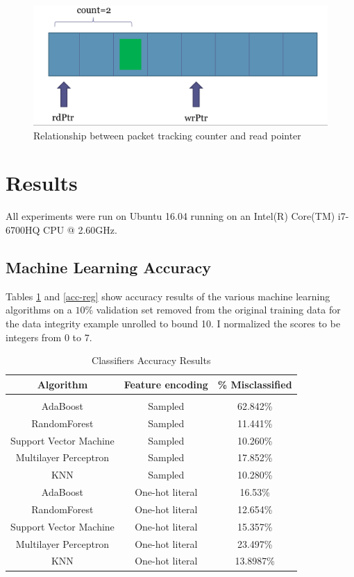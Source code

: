 \documentclass[letterpaper]{article} %
\begin{document}
\begin{figure}
\begin{center}
  \includegraphics[scale=0.15]{magicpacket.png}
  \caption{Relationship between packet tracking counter and read pointer}
  \label{mp}
\end{center}
\end{figure}

\section{Results}

All experiments were run on Ubuntu 16.04 running on an Intel(R) Core(TM) i7-6700HQ CPU @ 2.60GHz.

\subsection{Machine Learning Accuracy}

Tables \ref{acc-class} and \ref{acc-reg} show accuracy results of the various machine learning algorithms on a $10\%$ validation set removed from the original training data for the data integrity example unrolled to bound 10.  I normalized the scores to be integers from 0 to 7.

\begin{table}[h!]
\centering
\begin{tabular}{ c | c | c }
Algorithm & Feature encoding & \% Misclassified \\
\hline \\
AdaBoost & Sampled & 62.842\% \\
RandomForest & Sampled & 11.441\% \\
Support Vector Machine & Sampled & 10.260\% \\
Multilayer Perceptron & Sampled & 17.852\% \\
KNN & Sampled & 10.280\% \\ 
AdaBoost & One-hot literal & 16.53\%\\
RandomForest & One-hot literal & 12.654\% \\
Support Vector Machine & One-hot literal & 15.357\% \\
Multilayer Perceptron & One-hot literal & 23.497\% \\
KNN & One-hot literal & 13.8987\% 
\end{tabular}
\caption{Classifiers Accuracy Results}
\label{acc-class}
\end{table}
\end{document}
